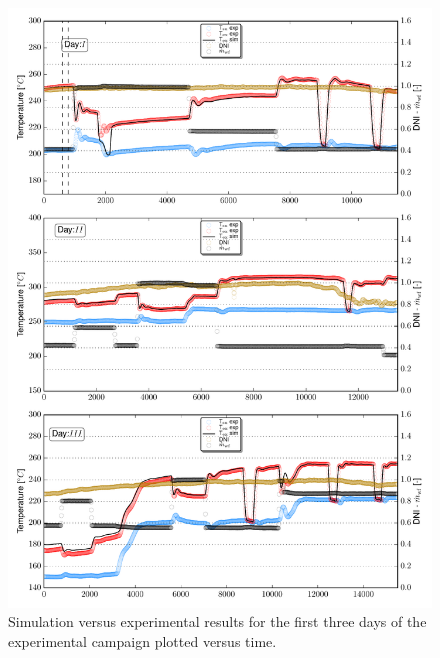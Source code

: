 \documentclass[final,3p,times,review]{elsarticle}
\begin{document}
\begin{figure}[h!]
\centering
\includegraphics[width=1\textwidth]{Figures/_FirstThreeDays.pdf}
\caption{Simulation versus experimental results for the first three days of the experimental campaign plotted versus time. }
\label{fig:SF_ModRes_All}
\end{figure}
%
%
\end{document}
